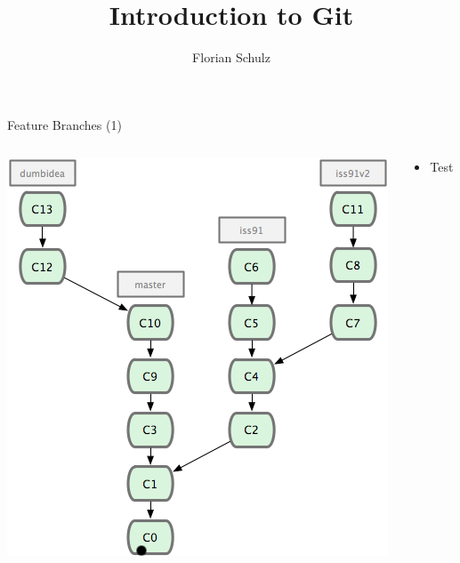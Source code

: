 \documentclass{beamer}
\title[Git]{Introduction to Git}
\author{Florian Schulz}
\begin{document}
\begin{frame}
\titlepage
\end{frame}

\begin{frame}{Feature Branches (1)}
\begin{columns}[T]
  \begin{column}{.5\textwidth}
    \begin{block}{}
      \includegraphics[scale=0.6]{images/feature-branches1.png}
    \end{block}
  \end{column}
  \begin{column}{.5\textwidth}
    \begin{block}{}  
      \begin{itemize}
        \pause \item Test
      \end{itemize}
    \end{block}
  \end{column}
\end{columns}  
\end{frame}
\end{document}
